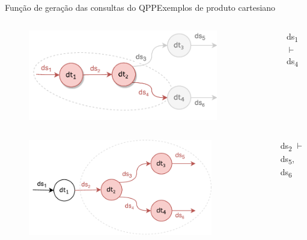 \documentclass[12pt,compress,final]{beamer}
\begin{document}

\begin{frame}[t]{Função de geração das consultas do QPP}{Exemplos de produto cartesiano}

\vspace{-.75cm}

\begin{columns}


\begin{figure}
\includegraphics[width=0.85\textwidth]{img/example-query-dataflow-1.pdf}
\end{figure}


ds\textsubscript{1} $\vdash$ ds\textsubscript{4}

\end{columns}

\begin{columns}[t]


\begin{figure}
\includegraphics[width=0.85\textwidth]{img/example-query-dataflow-2.pdf}
\end{figure}


ds\textsubscript{2} $\vdash$ ds\textsubscript{5}, ds\textsubscript{6}

\end{columns}

\end{frame}
\end{document}
